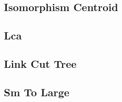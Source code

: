 \documentclass[10pt,portrait,twocolumn,a4paper,notitlepage]{article}
\newcommand\cppfile[2][]{%
\ifstrempty{#1}{}{}%
}
\begin{document}
\subsection{Isomorphism Centroid}
\cppfile{tree_clean/isomorphism_centroid.cpp}

\subsection{Lca}
\cppfile{tree_clean/LCA.cpp}

\subsection{Link Cut Tree}
\cppfile{tree_clean/link_cut_tree.cpp}

\subsection{Sm To Large}
\cppfile{tree_clean/sm_to_large.cpp}
\end{document}
